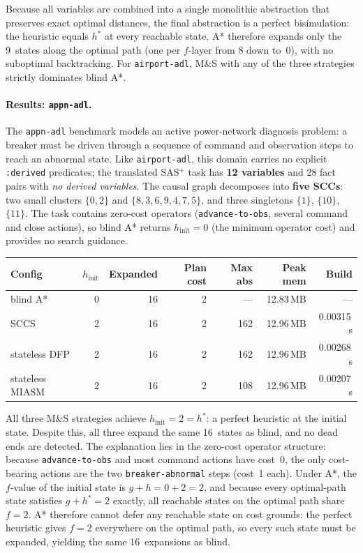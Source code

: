 \documentclass[11pt,a4paper]{article}
\begin{document}
Because all variables are combined into a single monolithic abstraction that
preserves exact optimal distances, the final abstraction is a perfect
bisimulation: the heuristic equals $h^*$ at every reachable state.
A* therefore expands only the 9~states along the optimal path (one per
$f$-layer from 8 down to~0), with no suboptimal backtracking.
For \texttt{airport-adl}, M\&S with any of the three strategies strictly
dominates blind A*.

\paragraph{Results: \texttt{appn-adl}.}

The \texttt{appn-adl} benchmark models an active power-network diagnosis
problem: a breaker must be driven through a sequence of command and observation
steps to reach an abnormal state.
Like \texttt{airport-adl}, this domain carries no explicit \texttt{:derived}
predicates; the translated SAS$^+$ task has \textbf{12 variables} and 28 fact
pairs with \emph{no derived variables}.
The causal graph decomposes into \textbf{five SCCs}:
two small clusters $\{0,2\}$ and $\{8,3,6,9,4,7,5\}$, and three singletons
$\{1\}$, $\{10\}$, $\{11\}$.
The task contains zero-cost operators (\texttt{advance-to-obs}, several command
and close actions), so blind A* returns $h_{\mathrm{init}} = 0$
(the minimum operator cost) and provides no search guidance.

\begin{center}
\small
\begin{tabular}{lrrrrrr}
\toprule
\textbf{Config} & \textbf{$h_{\mathrm{init}}$} & \textbf{Expanded}
  & \textbf{Plan cost} & \textbf{Max abs} & \textbf{Peak mem} & \textbf{Build} \\
\midrule
blind A*            & 0 & 16 & 2 & ---  & 12.83\,MB & ---       \\
SCCS                & 2 & 16 & 2 & 162  & 12.96\,MB & 0.00315\,s  \\
stateless DFP       & 2 & 16 & 2 & 162  & 12.96\,MB & 0.00268\,s  \\
stateless MIASM     & 2 & 16 & 2 & 108  & 12.96\,MB & 0.00207\,s  \\
\bottomrule
\end{tabular}
\end{center}

All three M\&S strategies achieve $h_{\mathrm{init}} = 2 = h^*$: a perfect
heuristic at the initial state.
Despite this, all three expand the same 16~states as blind, and no dead ends
are detected.
The explanation lies in the zero-cost operator structure: because
\texttt{advance-to-obs} and most command actions have cost~0, the only
cost-bearing actions are the two \texttt{breaker-abnormal} steps (cost~1 each).
Under A*, the $f$-value of the initial state is $g + h = 0 + 2 = 2$, and
because every optimal-path state satisfies $g + h^* = 2$ exactly, all
reachable states on the optimal path share $f = 2$.
A* therefore cannot defer any reachable state on cost grounds: the perfect
heuristic gives $f = 2$ everywhere on the optimal path, so every such state
must be expanded, yielding the same 16~expansions as blind.
\end{document}

